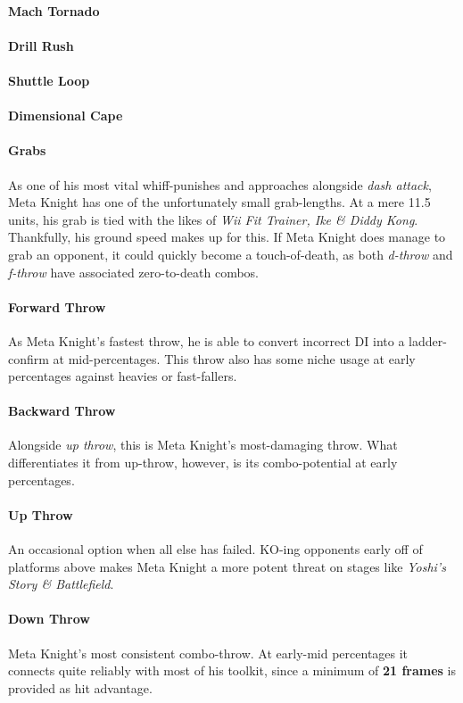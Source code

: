 \paragraph[Neutral Special]{Mach Tornado}
\paragraph[Side Special]{Drill Rush}
\paragraph[Up Special]{Shuttle Loop}
\paragraph[Down Special]{Dimensional Cape}
\paragraph{Grabs}
As one of his most vital whiff-punishes and approaches alongside \textit{dash attack}, Meta Knight has one of the unfortunately small grab-lengths. At a mere 11.5 units, his grab is tied with the likes of \textit{Wii Fit Trainer, Ike \& Diddy Kong}. Thankfully, his ground speed makes up for this. If Meta Knight does manage to grab an opponent, it could quickly become a touch-of-death, as both \textit{d-throw} and \textit{f-throw} have associated zero-to-death combos.
\paragraph{Forward Throw}
As Meta Knight's fastest throw, he is able to convert incorrect DI into a ladder-confirm at mid-percentages. This throw also has some niche usage at early percentages against heavies or fast-fallers.
\paragraph{Backward Throw}
Alongside \textit{up throw}, this is Meta Knight's most-damaging throw. What differentiates it from up-throw, however, is its combo-potential at early percentages.
\paragraph{Up Throw}
An occasional option when all else has failed. KO-ing opponents early off of platforms above makes Meta Knight a more potent threat on stages like \textit{Yoshi's Story \& Battlefield}.
\paragraph{Down Throw}
Meta Knight's most consistent combo-throw. At early-mid percentages it connects quite reliably with most of his toolkit, since a minimum of \textbf{21 frames} is provided as hit advantage.
